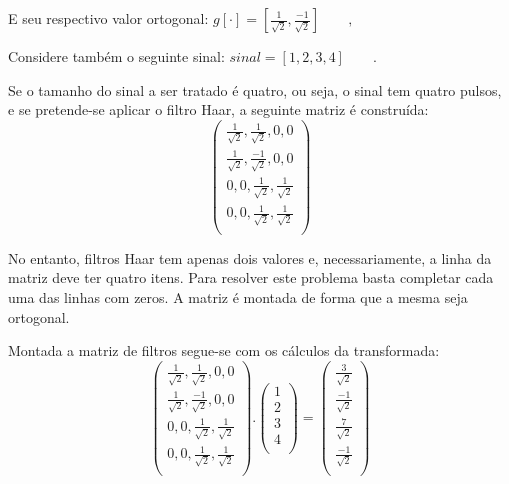 \documentclass[a4paper,12pt,openright,oneside]{book}
\newenvironment{myenv}[1]
  {\begin{spacing}{#1}}
  {\end{spacing}}
\begin{document}
\begin{myenv}{1.5}
				\par E seu respectivo valor ortogonal:
				$g[\cdot] = [\frac{1}{\sqrt{2}}, \frac{-1}{\sqrt{2}}]\qquad,$
				
				\par Considere também o seguinte sinal:	$sinal = [1,2,3,4]\qquad.$

				\par Se o tamanho do sinal a ser tratado é quatro, ou seja, o sinal tem quatro pulsos, e se pretende-se aplicar o filtro Haar, a seguinte matriz é construída:
				\begin{equation}
					\begin{pmatrix}
						\frac{1}{\sqrt{2}}, \frac{1}{\sqrt{2}}, 0, 0\\
						\frac{1}{\sqrt{2}}, \frac{-1}{\sqrt{2}}, 0, 0\\
						0, 0, \frac{1}{\sqrt{2}}, \frac{1}{\sqrt{2}}\\
						0, 0, \frac{1}{\sqrt{2}}, \frac{1}{\sqrt{2}}\\
					\end{pmatrix} 
				\end{equation}
				\par No entanto, filtros Haar tem apenas dois valores e, necessariamente, a linha da matriz deve ter quatro itens. Para resolver este problema basta completar cada uma das linhas com zeros. A matriz é montada de forma que a mesma seja ortogonal.

				\par Montada a matriz de filtros segue-se com os cálculos da transformada:
				\begin{equation}
					\begin{pmatrix}
						\frac{1}{\sqrt{2}}, \frac{1}{\sqrt{2}}, 0, 0\\
						\frac{1}{\sqrt{2}}, \frac{-1}{\sqrt{2}}, 0, 0\\
						0, 0, \frac{1}{\sqrt{2}}, \frac{1}{\sqrt{2}}\\
						0, 0, \frac{1}{\sqrt{2}}, \frac{1}{\sqrt{2}}\\
					\end{pmatrix} 
					.
					\begin{pmatrix}
						1\\
						2\\
						3\\
						4\\
					\end{pmatrix} 
					=
					\begin{pmatrix}
						\frac{3}{\sqrt{2}}\\
						\frac{-1}{\sqrt{2}}\\
						\frac{7}{\sqrt{2}}\\
						\frac{-1}{\sqrt{2}}\\
					\end{pmatrix}
				\end{equation}
				

\end{myenv}
\end{document}
